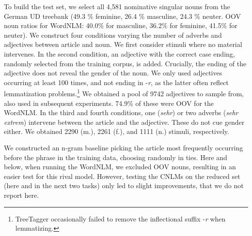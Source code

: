 To build the test set, we select all 4,581 nominative singular nouns from
the German UD treebank  (49.3 \% feminine, 26.4 \% masculine, 24.3 \% neuter. OOV noun ratios %
for WordNLM: 40.0\% for masculine, 36.2\% for feminine, 41.5\% for
neuter). %
We construct four conditions varying the number of adverbs and
adjectives between article and noun.  We first consider stimuli where
no material
intervenes. %
In the second condition, an adjective with the correct case ending,
randomly selected from the training corpus, is added. Crucially, the
ending of the adjective does not reveal the gender of the noun.  We
only used adjectives occurring at least 100 times, and not ending in
-\emph{r}, as the latter often reflect lemmatization
problems.\footnote{TreeTagger occasionally failed to remove the
  inflectional suffix -\emph{r} when lemmatizing.}  We obtained a pool
of 9742 adjectives to sample from, also used in subsequent
experiments.  74.9\% of these were OOV for the WordNLM.  In the third
and fourth conditions, one (\emph{sehr}) or two adverbs (\emph{sehr
  extrem}) intervene between the article and the adjective. These do
not cue gender either. We obtained 2290 (m.), 2261 (f.), and 1111 (n.)
stimuli, respectively.

We constructed an n-gram baseline picking the article most frequently
occurring before the phrase in the training data, choosing randomly in
ties. Here and below, when running the WordNLM, we excluded OOV nouns,
resulting in an easier test for this rival model. However, testing the
CNLMs on the reduced set (here and in the next two tasks) only led to
slight improvements, that we do not report here.

